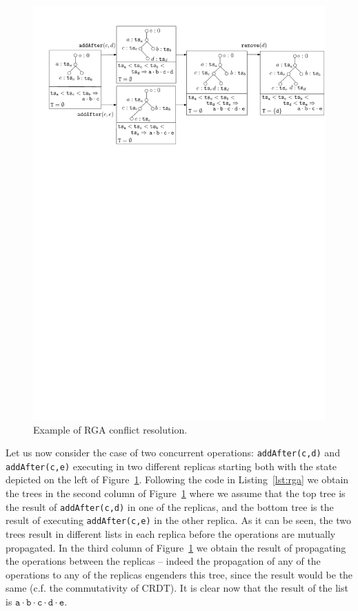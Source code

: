 \begin{figure}[t]
  \centering
  \includegraphics[width=.8\textwidth]{figures/RGA-Trace}
  \caption{Example of RGA conflict resolution.}
  \label{fig:rga-trace}
\end{figure}

Let us now consider the case of two concurrent operations:
\lstinline|addAfter(c,d)| and \lstinline|addAfter(c,e)| executing in
two different replicas starting both with the state depicted on the
left of Figure~\ref{fig:rga-trace}.
%
Following the code in Listing~\ref{lst:rga} we obtain the trees in the
second column of Figure~\ref{fig:rga-trace} where we assume that the
top tree is the result of \lstinline|addAfter(c,d)| in one of the
replicas, and the bottom tree is the result of executing
\lstinline|addAfter(c,e)| in the other replica.
%
As it can be seen, the two trees result in different lists in each
replica before the operations are mutually propagated.
%
In the third column of Figure~\ref{fig:rga-trace} we obtain the
result of propagating the operations between the replicas -- indeed
the propagation of any of the operations to any of the replicas
engenders this tree, since the result would be the same (c.f. the
commutativity of CRDT).
%
It is clear now that the result of the list is $\mathtt{a \cdot b
  \cdot c \cdot d \cdot e}$.


